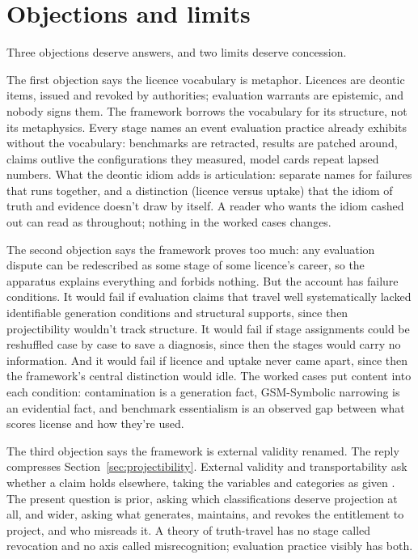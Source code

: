 \documentclass[12pt]{article}
\begin{document}
\section{Objections and limits}\label{sec:objections}

Three objections deserve answers, and two limits deserve concession.

The first objection says the licence vocabulary is metaphor. Licences are
deontic items, issued and revoked by authorities; evaluation warrants are
epistemic, and nobody signs them. The framework borrows the vocabulary for its
structure, not its metaphysics. Every stage names an event evaluation practice
already exhibits without the vocabulary: benchmarks are retracted, results are
patched around, claims outlive the configurations they measured, model cards
repeat lapsed numbers. What the deontic idiom adds is articulation: separate
names for failures that  runs together, and a distinction
(licence versus uptake) that the idiom of truth and evidence doesn't draw by
itself. A reader who wants the idiom cashed out can read  as
 throughout; nothing in
the worked cases changes.

The second objection says the framework proves too much: any evaluation dispute
can be redescribed as some stage of some licence's career, so the apparatus
explains everything and forbids nothing. But the account has failure
conditions. It would fail if evaluation claims that travel well systematically
lacked identifiable generation conditions and structural supports, since then
projectibility wouldn't track structure. It would fail if stage assignments
could be reshuffled case by case to save a diagnosis, since then the stages
would carry no information. And it would fail if licence and uptake never came
apart, since then the framework's central distinction would idle. The worked
cases put content into each condition: contamination is a generation fact,
GSM-Symbolic narrowing is an evidential fact, and benchmark essentialism is an
observed gap between what scores license and how they're used.

The third objection says the framework is external validity renamed. The reply
compresses Section~\ref{sec:projectibility}. External validity and
transportability ask whether a claim holds elsewhere, taking the variables and
categories as given \citep{bareinboim2016causal}. The present question is
prior, asking which classifications deserve projection at all, and wider,
asking what generates, maintains, and revokes the entitlement to project, and
who misreads it. A theory of truth-travel has no stage called revocation and no
axis called misrecognition; evaluation practice visibly has both.
\end{document}
